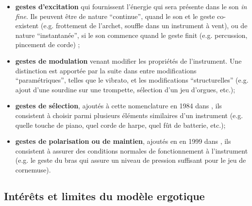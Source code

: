 	\begin{itemize}[noitemsep]
		\item \textbf{gestes d'excitation} qui fournissent l'énergie qui sera présente dans le son \textit{in fine}. Ils peuvent être de nature ``continue'', quand le son et le geste co-existent (e.g. frottement de l'archet, souffle dans un instrument à vent), ou de nature ``instantanée'', si le son commence quand le geste finit (e.g. percussion, pincement de corde) \cite{cadoz_gesture_2000};
		\item \textbf{gestes de modulation} venant modifier les propriétés de l'instrument. Une distinction est apportée par la suite dans \cite{cadoz_synthese_1983} entre modifications ``paramétriques'', telles que le vibrato, et les modifications ``structurelles'' (e.g. ajout d'une sourdine sur une trompette, sélection d'un jeu d'orgues, etc.);
		\item \textbf{gestes de sélection}, ajoutés à cette nomenclature en 1984 dans \cite{luciani_modelisation_1984}, ils consistent à choisir parmi plusieurs éléments similaires d'un instrument (e.g. quelle touche de piano, quel corde de harpe, quel fût de batterie, etc.);
		\item \textbf{gestes de polarisation ou de maintien}, ajoutés en en 1999 dans \cite{cadoz_gesture_2000}, ils consistent à assurer des conditions normales de fonctionnement à l'instrument (e.g. le geste du bras qui assure un niveau de pression suffisant pour le jeu de cornemuse).
\end{itemize}

\subsection{Intérêts et limites du modèle ergotique}

